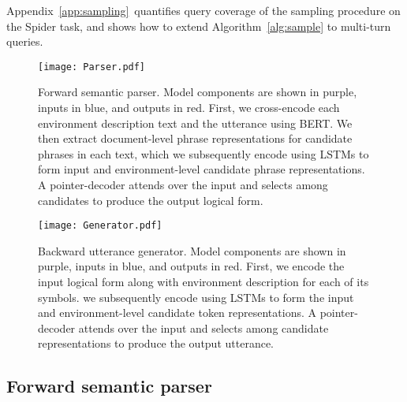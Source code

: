\documentclass[11pt,a4paper]{article}
\begin{document}
Appendix~\ref{app:sampling}~quantifies query coverage of the sampling procedure on the Spider task, and shows how to extend Algorithm~\ref{alg:sample} to multi-turn queries.


\begin{figure*}[t]
    \centering
    \texttt{[image: Parser.pdf]}
    \caption{
    Forward semantic parser.
    Model components are shown in purple, inputs in blue, and outputs in red.
    First, we cross-encode each environment description text and the utterance using BERT.
    We then extract document-level phrase representations for candidate phrases in each text, which we subsequently encode using LSTMs to form input and environment-level candidate phrase representations.
    A pointer-decoder attends over the input and selects among candidates to produce the output logical form.
    }
    \vspace{-0.15in}
    \label{fig:forward}
\end{figure*}


\begin{figure*}[t]
    \centering
    \texttt{[image: Generator.pdf]}
    \caption{
    Backward utterance generator.
    Model components are shown in purple, inputs in blue, and outputs in red.
    First, we encode the input logical form along with environment description for each of its symbols.
    we subsequently encode using LSTMs to form the input and environment-level candidate token representations.
    A pointer-decoder attends over the input and selects among candidate representations to produce the output utterance.
    }
    \vspace{-0.15in}
    \label{fig:backward}
\end{figure*}



\subsection{Forward semantic parser}
\label{sec:parser}
\end{document}
